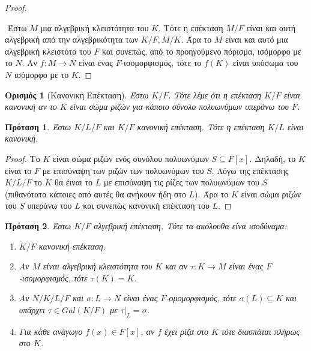 \documentclass[oneside,a4paper]{article}
\newtheorem*{defn}{Ορισμός}
\newtheorem{prop}{Πρόταση}
\begin{document}
\begin{proof} $ $

	$ $\newline
	Έστω $M$ μια αλγεβρική κλειστότητα του $K$. Τότε η επέκταση $M/F$ είναι και αυτή αλγεβρική από την αλγεβρικότητα των $K/F, M/K$. Άρα το $M$ είναι και αυτό μια αλγεβρική κλειστότα του $F$ και συνεπώς, από το προηγούμενο πόρισμα, ισόμορφο με το $N$. Αν $f:M \rightarrow N$ είναι ένας $F$-ισομορφισμός, τότε το $f(K)$ είναι υπόσωμα του $N$ ισόμορφο με το $K$. 
\end{proof}
\vspace{0.1cm}

\begin{defn}[Κανονική Επέκταση] Έστω $K/F$. Τότε λέμε ότι η επέκταση $K/F$ είναι κανονική αν το $K$ είναι σώμα ριζών για κάποιο σύνολο πολυωνύμων υπεράνω του $F$.
\end{defn}
\vspace{0.1cm}
\begin{prop}
	\label{exa3.25}
	Έστω $K/L/F$ και $K/F$ κανονική επέκταση. Τότε η επέκταση $K/L$ είναι κανονική.
\end{prop}
\begin{proof}
	Το $K$ είναι σώμα ριζών ενός συνόλου πολυωνύμων $S \subseteq F[x]$. Δηλαδή, το $K$ είναι το $F$ με επισύναψη των ριζών των πολυωνύμων του $S$. Λόγω της επέκτασης $K/L/F$ το $K$ θα έιναι το $L$ με επισύναψη τις ρίζες των πολυωνύμων του $S$ (πιθανότατα κάποιες από αυτές θα ανήκουν ήδη στο $L$). Άρα το $K$ είναι σώμα ριζών του $S$ υπεράνω του $L$ και συνεπώς κανονική επέκταση του $L$.
\end{proof}
\vspace{0.1cm}
\begin{prop}%
	\label{3.28}
	Έστω $K/F$ αλγεβρική επέκταση. Τότε τα ακόλουθα είνα ισοδύναμα:
	\begin{enumerate}
		\item $K/F$ κανονική επέκταση.
		\item Αν $M$ είναι αλγεβρική κλειστότητα του $K$ και αν $\tau : K \rightarrow M$ είναι ένας $F$-ισομορφισμός, τότε $\tau(K) = K$. %
		\item Αν $N/K/L/F$ και $\sigma : L \rightarrow N$ είναι ένας $F$-ομομορφισμός, τότε $\sigma(L) \subseteq K$ και υπάρχει $\tau \in Gal(K/F)$ με $\tau|_L = \sigma$.
		\item Για κάθε ανάγωγο $f(x) \in F[x]$, αν $f$ έχει ρίζα στο $K$ τότε διασπάται πλήρως στο $K$.
	\end{enumerate}
\end{prop}
\end{document}
